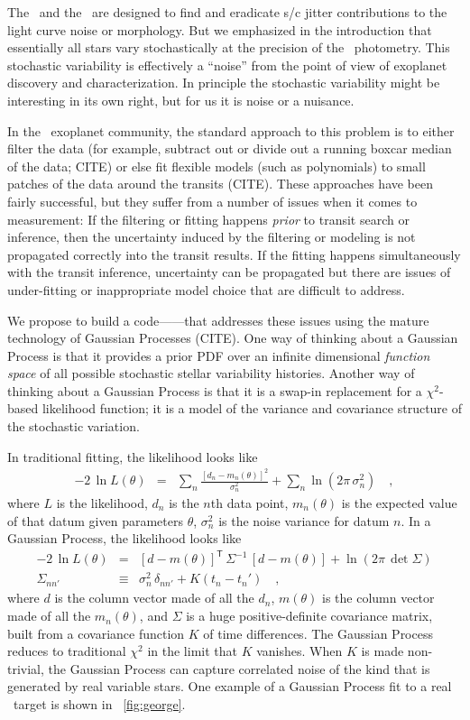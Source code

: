 \documentclass[letterpaper,12pt,preprint]{hack_aastex}
\newcommand{\transpose}[1]{{#1}^{\!\mathsf{T}}}
\newcommand{\inverse}[1]{{#1}^{-1}}
\begin{document}
The \PLM\ and the \OWL\ are designed to find and eradicate s/c jitter
contributions to the light curve noise or morphology.
But we emphasized in the introduction that essentially all stars vary
stochastically at the precision of the \Kepler\ photometry.
This stochastic variability is effectively a ``noise'' from the point of view
of exoplanet discovery and characterization.
In principle the stochastic variability might be interesting in its own right,
but for us it is noise or a nuisance.

In the \Kepler\ exoplanet community, the standard approach to this problem is
to either filter the data (for example, subtract out or divide out a running
boxcar median of the data; CITE)
or else fit flexible models (such as polynomials)
to small patches of the data around the transits (CITE).
These approaches have been fairly successful, but they suffer from a number
of issues when it comes to measurement:
If the filtering or fitting happens \emph{prior} to transit search or inference,
then the uncertainty induced by the filtering or modeling is not propagated
correctly into the transit results.
If the fitting happens simultaneously with the transit inference, uncertainty
can be propagated but there are issues of under-fitting or inappropriate model
choice that are difficult to address.

We propose to build a code---\George---that addresses these issues using the
mature technology of Gaussian Processes (CITE).
One way of thinking about a Gaussian Process is that it provides a prior PDF
over an infinite dimensional \emph{function space} of all possible stochastic
stellar variability histories.
Another way of thinking about a Gaussian Process is that it is a swap-in
replacement for a $\chi^2$-based likelihood function;
it is a model of the variance and covariance structure of the stochastic
variation.

In traditional fitting, the likelihood looks like
\begin{eqnarray}
-2\,\ln L(\theta) &=& \sum_n \frac{[d_n - m_n(\theta)]^2}{\sigma_n^2} + \sum_n \ln (2\pi\,\sigma_n^2)
\quad ,
\end{eqnarray}
where $L$ is the likelihood,
$d_n$ is the $n$th data point,
$m_n(\theta)$ is the expected value of that datum given parameters $\theta$,
$\sigma_n^2$ is the noise variance for datum $n$.
In a Gaussian Process, the likelihood looks like
\begin{eqnarray}
-2\,\ln L(\theta) &=& \transpose{[d - m(\theta)]}\,\inverse{\Sigma}\,[d - m(\theta)] + \ln (2\pi\,\det{\Sigma})
\\
\Sigma_{nn'} &\equiv& \sigma_n^2\,\delta_{nn'} + K(t_n - t_n')
\quad ,
\end{eqnarray}
where $d$ is the column vector made of all the $d_n$,
$m(\theta)$ is the column vector made of all the $m_n(\theta)$,
and $\Sigma$ is a huge positive-definite covariance matrix,
built from a covariance function $K$ of time differences.
The Gaussian Process reduces to traditional $\chi^2$ in the limit that $K$
vanishes.
When $K$ is made non-trivial, the Gaussian Process can capture correlated
noise of the kind that is generated by real variable stars.
One example of a Gaussian Process fit to a real \Kepler\ target is shown in
\figurename~\ref{fig:george}.
\end{document}
